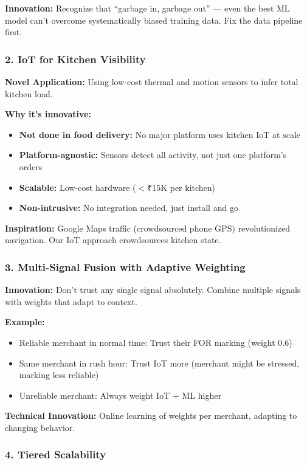 \documentclass[11pt,a4paper]{article}
\begin{document}
\textbf{Innovation:} Recognize that ``garbage in, garbage out'' — even the best ML model can't overcome systematically biased training data. Fix the data pipeline first.

\subsubsection{2. IoT for Kitchen Visibility}

\textbf{Novel Application:} Using low-cost thermal and motion sensors to infer total kitchen load.

\textbf{Why it's innovative:}
\begin{itemize}[leftmargin=*]
    \item \textbf{Not done in food delivery:} No major platform uses kitchen IoT at scale
    \item \textbf{Platform-agnostic:} Sensors detect all activity, not just one platform's orders
    \item \textbf{Scalable:} Low-cost hardware ($<$₹15K per kitchen)
    \item \textbf{Non-intrusive:} No integration needed, just install and go
\end{itemize}

\textbf{Inspiration:} Google Maps traffic (crowdsourced phone GPS) revolutionized navigation. Our IoT approach crowdsources kitchen state.

\subsubsection{3. Multi-Signal Fusion with Adaptive Weighting}

\textbf{Innovation:} Don't trust any single signal absolutely. Combine multiple signals with weights that adapt to context.

\textbf{Example:}
\begin{itemize}
    \item Reliable merchant in normal time: Trust their FOR marking (weight 0.6)
    \item Same merchant in rush hour: Trust IoT more (merchant might be stressed, marking less reliable)
    \item Unreliable merchant: Always weight IoT + ML higher
\end{itemize}

\textbf{Technical Innovation:} Online learning of weights per merchant, adapting to changing behavior.

\subsubsection{4. Tiered Scalability}
\end{document}
